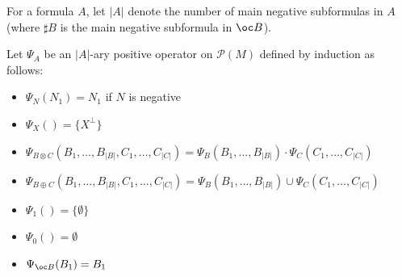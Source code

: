 \documentclass[11pt]{article}
\newcommand\0{\textbf{0}}
\newcommand\1{\textbf{1}}
\newcommand\size[1]{{\lvert #1 \rvert}}
\begin{document}
For a formula $A$, let $\size{A}$ denote the number of main negative subformulas in $A$
(where $\sharp B$ is the main negative subformula in $\oc B$).

Let $\Psi_A$ be an $\size{A}$-ary positive operator on $\mathcal P(M)$ defined by induction as follows:
\begin{itemize}
    \item $\Psi_N(N_1) = N_1$ if $N$ is negative
    \item $\Psi_X() = \{X^\perp\}$
    \item $\Psi_{B \otimes C}(B_1, \dots, B_\size{B}, C_1, \dots, C_\size{C}) = \Psi_B(B_1, \dots, B_\size{B}) \cdot \Psi_C(C_1, \dots, C_\size{C})$
    \item $\Psi_{B \oplus C}(B_1, \dots, B_\size{B}, C_1, \dots, C_\size{C}) = \Psi_B(B_1, \dots, B_\size{B}) \cup \Psi_C(C_1, \dots, C_\size{C})$
    \item $\Psi_1() = \{\emptyset\}$
    \item $\Psi_0() = \emptyset$
    \item $\Psi_{\oc B}(B_1) = B_1$
\end{itemize}
\end{document}
